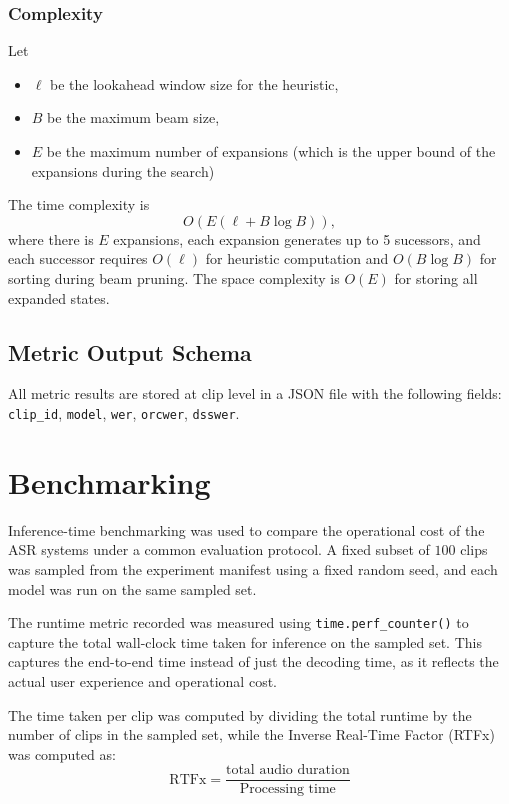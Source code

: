 \subsubsection{Complexity}
Let
\begin{itemize}
    \item $\ell$ be the lookahead window size for the heuristic,
    \item $B$ be the maximum beam size,
    \item $E$ be the maximum number of expansions (which is the upper bound of the expansions during the search)
\end{itemize}
The time complexity is
\begin{equation}
O(E(\ell + B\log B)),
\end{equation}
where there is $E$ expansions, each expansion generates up to 5 sucessors, and each successor requires $O(\ell)$ for heuristic computation and $O(B\log B)$ for sorting during beam pruning. The space complexity is $O(E)$ for storing all expanded states.

\subsection{Metric Output Schema}
All metric results are stored at clip level in a JSON file with the following fields: \texttt{clip\_id}, \texttt{model}, \texttt{wer}, \texttt{orcwer}, \texttt{dsswer}.

\section{Benchmarking}
\label{subsec:inference_time_benchmarking}

Inference-time benchmarking was used to compare the operational cost of the ASR systems under a common evaluation protocol. A fixed subset of $100$ clips was sampled from the experiment manifest using a fixed random seed, and each model was run on the same sampled set.

The runtime metric recorded was measured using \texttt{time.perf\_counter()} to capture the total wall-clock time taken for inference on the sampled set. This captures the end-to-end time instead of just the decoding time, as it reflects the actual user experience and operational cost.

The time taken per clip was computed by dividing the total runtime by the number of clips in the sampled set, while the Inverse Real-Time Factor (RTFx) was computed as:
\begin{equation}
\mathrm{RTFx} = \frac{\text{total audio duration}}{\text{Processing time}}
\end{equation}

